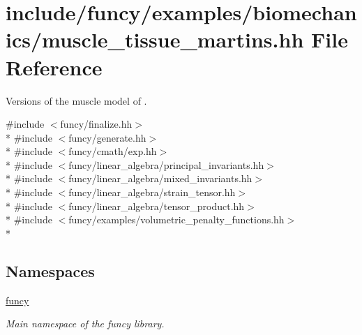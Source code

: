 \hypertarget{muscle__tissue__martins_8hh}{\section{include/funcy/examples/biomechanics/muscle\-\_\-tissue\-\_\-martins.hh File Reference}
\label{muscle__tissue__martins_8hh}
}


Versions of the muscle model of \cite{Martins1998}.  


{\ttfamily \#include $<$funcy/finalize.\-hh$>$}\\*
{\ttfamily \#include $<$funcy/generate.\-hh$>$}\\*
{\ttfamily \#include $<$funcy/cmath/exp.\-hh$>$}\\*
{\ttfamily \#include $<$funcy/linear\-\_\-algebra/principal\-\_\-invariants.\-hh$>$}\\*
{\ttfamily \#include $<$funcy/linear\-\_\-algebra/mixed\-\_\-invariants.\-hh$>$}\\*
{\ttfamily \#include $<$funcy/linear\-\_\-algebra/strain\-\_\-tensor.\-hh$>$}\\*
{\ttfamily \#include $<$funcy/linear\-\_\-algebra/tensor\-\_\-product.\-hh$>$}\\*
{\ttfamily \#include $<$funcy/examples/volumetric\-\_\-penalty\-\_\-functions.\-hh$>$}\\*
\subsection*{Namespaces}
\begin{DoxyCompactItemize}
\item 
\hyperlink{namespacefuncy}{funcy}
\begin{DoxyCompactList}\small\item\em Main namespace of the funcy library. \end{DoxyCompactList}\end{DoxyCompactItemize}

